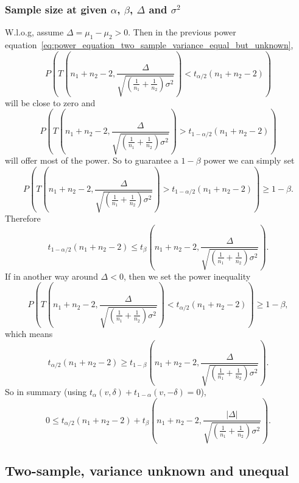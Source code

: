 \documentclass[a4paper,12pt]{article}
\begin{document}
\subsubsection{Sample size at given $\alpha$, $\beta$, $\Delta$ and $\sigma^2$}
\label{sec:sample-size-at-3}

W.l.o.g, assume $\Delta = \mu_1 - \mu_2 > 0$. Then in the previous power equation~\eqref{eq:power_equation_two_sample_variance_equal_but_unknown},
\[
  P\left(
    T{\left(
        n_1 + n_2 - 2,
        \frac{\Delta}{\sqrt{\left(\frac{1}{n_1} + \frac{1}{n_2}\right)\sigma^2}}
      \right)}
    < t_{\alpha / 2}\left(n_1 + n_2 - 2\right)
  \right)
\]
will be close to zero and
\[
  P\left(
    T{\left(
        n_1 + n_2 - 2,
        \frac{\Delta}{\sqrt{\left(\frac{1}{n_1} + \frac{1}{n_2}\right)\sigma^2}}
      \right)}
    > t_{1 - \alpha / 2}\left(n_1 + n_2 - 2\right)
  \right) 
\]
will offer most of the power. So to guarantee a $1 - \beta$ power we can simply set
\[
  P\left(
    T{\left(
        n_1 + n_2 - 2,
        \frac{\Delta}{\sqrt{\left(\frac{1}{n_1} + \frac{1}{n_2}\right)\sigma^2}}
      \right)}
    > t_{1 - \alpha / 2}\left(n_1 + n_2 - 2\right)
  \right)
  \geq 1 - \beta
  .
\]
Therefore
\[
  t_{1 - \alpha / 2}\left(n_1 + n_2 - 2\right)
  \leq
  t_{\beta}\left(
    n_1 + n_2 - 2,
    \frac{\Delta}{\sqrt{\left(\frac{1}{n_1} + \frac{1}{n_2}\right)\sigma^2}}
  \right)
  .
\]
If in another way around $\Delta < 0$, then we set the power inequality
\[
  P\left(
    T{\left(
        n_1 + n_2 - 2,
        \frac{\Delta}{\sqrt{\left(\frac{1}{n_1} + \frac{1}{n_2}\right)\sigma^2}}
      \right)}
    < t_{\alpha / 2}\left(n_1 + n_2 - 2\right)
  \right)
  \geq 1 - \beta
  ,
\]
which means
\[
  t_{\alpha / 2}\left(n_1 + n_2 - 2\right)
  \geq
  t_{1 - \beta}\left(
    n_1 + n_2 - 2,
    \frac{\Delta}{\sqrt{\left(\frac{1}{n_1} + \frac{1}{n_2}\right)\sigma^2}}
  \right)
  .
\]
So in summary (using $t_{\alpha}\left(v, \delta\right) + t_{1 - \alpha}\left(v, -\delta\right) = 0$),
\[
  0
  \leq
  t_{\alpha / 2}\left(n_1 + n_2 - 2\right)
  + t_{\beta}\left(
    n_1 + n_2 - 2,
    \frac{\left|\Delta\right|}{\sqrt{\left(\frac{1}{n_1} + \frac{1}{n_2}\right)\sigma^2}}
  \right)
  .
\]

\subsection{Two-sample, variance unknown and unequal}
\label{sec:two-sample-variance-2}
\end{document}
